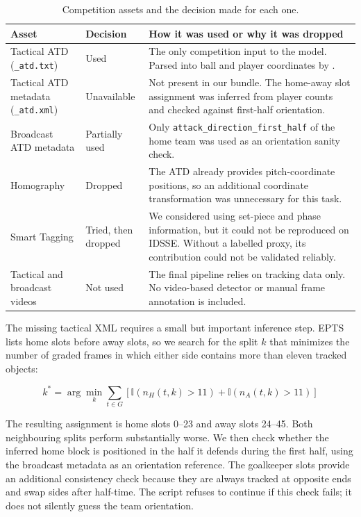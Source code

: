 \documentclass[11pt,a4paper]{article}
\begin{document}
\begin{table}[H]
\centering
\small
\caption{Competition assets and the decision made for each one.}

\begin{tabularx}{\textwidth}{L{0.28\textwidth} L{0.22\textwidth} Y}
\toprule
\textbf{Asset} & \textbf{Decision} & \textbf{How it was used or why it was dropped} \\
\midrule

Tactical ATD (\texttt{\_atd.txt})
&
Used
&
The only competition input to the model. Parsed into ball and player coordinates by .
\\

Tactical ATD metadata (\texttt{\_atd.xml})
&
Unavailable
&
Not present in our bundle. The home-away slot assignment was inferred from player counts and checked against first-half orientation.
\\

Broadcast ATD metadata
&
Partially used
&
Only \texttt{attack\_direction\_first\_half} of the home team was used as an orientation sanity check.
\\

Homography
&
Dropped
&
The ATD already provides pitch-coordinate positions, so an additional coordinate transformation was unnecessary for this task.
\\

Smart Tagging
&
Tried, then dropped
&
We considered using set-piece and phase information, but it could not be reproduced on IDSSE. Without a labelled proxy, its contribution could not be validated reliably.
\\

Tactical and broadcast videos
&
Not used
&
The final pipeline relies on tracking data only. No video-based detector or manual frame annotation is included.
\\

\bottomrule
\end{tabularx}
\end{table}

The missing tactical XML requires a small but important inference step. EPTS lists home slots before away slots, so we search for the split \(k\) that minimizes the number of graded frames in which either side contains more than eleven tracked objects:

\[
k^* =
\arg\min_k
\sum_{t \in G}
\left[
\mathbb{I}(n_H(t,k)>11)
+
\mathbb{I}(n_A(t,k)>11)
\right]
\]

The resulting assignment is home slots 0--23 and away slots 24--45. Both neighbouring splits perform substantially worse. We then check whether the inferred home block is positioned in the half it defends during the first half, using the broadcast metadata as an orientation reference. The goalkeeper slots provide an additional consistency check because they are always tracked at opposite ends and swap sides after half-time. The script refuses to continue if this check fails; it does not silently guess the team orientation.
\end{document}
